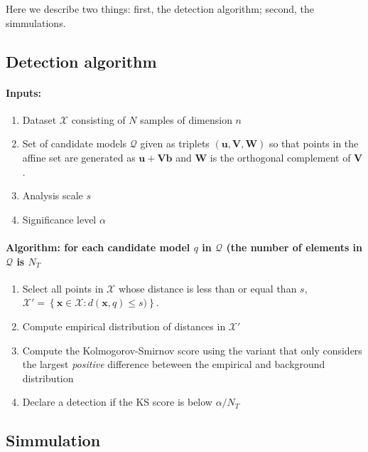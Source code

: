 \documentclass[a4page,11pt]{article}
\renewcommand{\vec}[1]{\mathbf{#1}}%
\newcommand{\mat}[1]{\mathbf{#1}}%
\newcommand{\set}[1]{\mathcal{#1}}%
\newcommand{\setdef}[1]{\left\{#1\right\}}%
\begin{document}
Here we describe two things: first, the detection algorithm; second, the  simmulations.


\subsection{Detection algorithm}

\paragraph{Inputs:} 
\begin{enumerate}
\item Dataset $\set{X}$ consisting of $N$ samples of dimension $n$
\item Set of candidate models $\set{Q}$ given as triplets $(\vec{u},\vec{V},\vec{W})$ so that points in the affine set are generated as $\vec{u} + \mat{V}\vec{b}$ and $\vec{W}$ is the orthogonal complement of $\mat{V}$.
\item Analysis scale $s$
\item Significance level $\alpha$
\end{enumerate}

\paragraph{Algorithm: for each candidate model $q$ in $\set{Q}$ (the number of elements in $\set{Q}$ is $N_T$}
\begin{enumerate}
\item Select all points in $\set{X}$ whose distance is less than or equal than $s$, $\set{X}' = \setdef{\vec{x} \in \set{X}: d(\vec{x},q) \leq s)}$.
\item Compute empirical distribution of distances in $\set{X}'$
\item Compute the Kolmogorov-Smirnov score using the variant that only considers the largest \emph{positive} difference beteween the empirical and background distribution
\item Declare a detection if the KS score is below $\alpha/N_T$
\end{enumerate}

\subsection{Simmulation}
\end{document}

